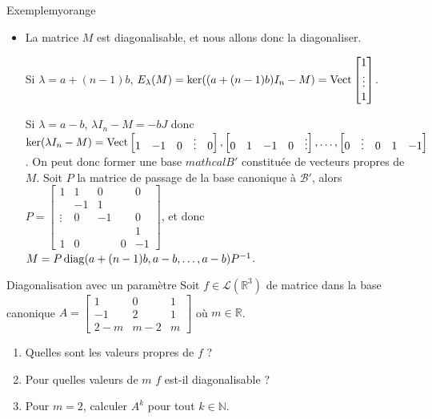 \begin{omed}{Exemple}{myorange}
\begin{itemize}
            Si $\lambda = a-b$, on a $\lambda I_n - M = - b J$ donc $\rg(\lambda I_n - M) = 1$ et $\dim(E_{\lambda}(M)) = n - 1 = m_{\lambda}(M)$.
            \item La matrice $M$ est diagonalisable, et nous allons donc la diagonaliser.
            
            Si $\lambda = a + (n-1) b$, $E_{\lambda}(M) = \ker((a + (n-1)b) I_n - M) = \operatorname{Vect}\begin{bmatrix}
                1 \\
                \vdots \\
                1
            \end{bmatrix}$.

            Si $\lambda = a-b$, $\lambda I_n - M = -b J$ donc $\ker(\lambda I_n - M ) = \operatorname{Vect}\begin{bmatrix}
                1 & 
                -1 &
                0 &
                \vdots &
                0
            \end{bmatrix}, \begin{bmatrix}
                0 & 
                1 & 
                -1 &
                0 &
                \vdots
            \end{bmatrix}, \ldots, \begin{bmatrix}
                0 & 
                \vdots & 
                0 & 
                1 &
                -1
            \end{bmatrix}$. On peut donc former une base $mathcal{B}'$ constituée de vecteurs propres de $M$. Soit $P$ la matrice de passage de la base canonique à $\mathcal{B}'$, alors $P = \begin{bmatrix}
                1 & 1 & 0 & & 0 \\
                & -1 & 1 & & \\
                \vdots & 0 & -1 &  & 0 \\
                & & & & 1 \\
                1 & 0 & & 0 & -1
            \end{bmatrix}$, et donc $M = P \operatorname{diag}(a + (n-1)b, a - b, \ldots, a-b) P^{-1}$.
        \end{itemize}
    \end{omed}

\begin{exo}{Diagonalisation avec un paramètre}{}
    Soit $f \in \mathcal{L}(\mathbb{R}^3)$ de matrice dans la base canonique $A = \begin{bmatrix}
        1 & 0 & 1 \\
        -1 & 2 & 1 \\
        2-m & m-2 & m
    \end{bmatrix}$ où $m \in \mathbb{R}$.
    \begin{enumerate}
        \item Quelles sont les valeurs propres de $f$ ?
        \item Pour quelles valeurs de $m$ $f$ est-il diagonalisable ?
        \item Pour $m = 2$, calculer $A^k$ pour tout $k \in \mathbb{N}$.
    \end{enumerate}
\end{exo}

